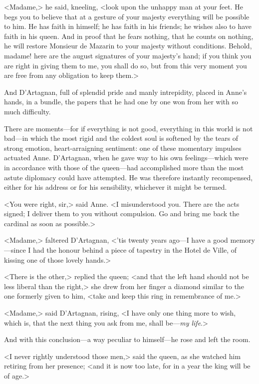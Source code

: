 <Madame,> he said, kneeling, <look upon the unhappy man at your feet. He begs you to believe that at a gesture of your majesty everything will be possible to him. He has faith in himself; he has faith in his friends; he wishes also to have faith in his queen. And in proof that he fears nothing, that he counts on nothing, he will restore Monsieur de Mazarin to your majesty without conditions. Behold, madame! here are the august signatures of your majesty's hand; if you think you are right in giving them to me, you shall do so, but from this very moment you are free from any obligation to keep them.>

And D'Artagnan, full of splendid pride and manly intrepidity, placed in Anne's hands, in a bundle, the papers that he had one by one won from her with so much difficulty.

There are moments—for if everything is not good, everything in this world is not bad—in which the most rigid and the coldest soul is softened by the tears of strong emotion, heart-arraigning sentiment: one of these momentary impulses actuated Anne. D'Artagnan, when he gave way to his own feelings—which were in accordance with those of the queen—had accomplished more than the most astute diplomacy could have attempted. He was therefore instantly recompensed, either for his address or for his sensibility, whichever it might be termed.

<You were right, sir,> said Anne. <I misunderstood you. There are the acts signed; I deliver them to you without compulsion. Go and bring me back the cardinal as soon as possible.>

<Madame,> faltered D'Artagnan, <'tis twenty years ago—I have a good memory—since I had the honour behind a piece of tapestry in the Hotel de Ville, of kissing one of those lovely hands.>

<There is the other,> replied the queen; <and that the left hand should not be less liberal than the right,> she drew from her finger a diamond similar to the one formerly given to him, <take and keep this ring in remembrance of me.>

<Madame,> said D'Artagnan, rising, <I have only one thing more to wish, which is, that the next thing you ask from me, shall be—\textit{my life}.>

And with this conclusion—a way peculiar to himself—he rose and left the room.

<I never rightly understood those men,> said the queen, as she watched him retiring from her presence; <and it is now too late, for in a year the king will be of age.>

